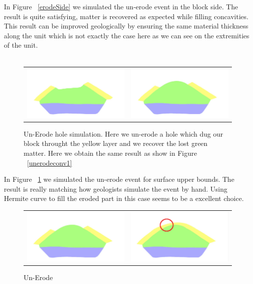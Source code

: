 \documentclass[12pt, a4paper]{report} %
\begin{document}
In Figure ~\ref{erodeSide} we simulated the un-erode event in the block side. The result is quite satisfying, matter is recovered as expected while filling concavities. This result can be improved geologically by ensuring the same material thickness along the unit which is not exactly the case here as we can see on the extremities of the unit.\\\\
\begin{figure}[H]
\centering
\begin{tabular}{@{}cc@{}}
\includegraphics[width=.49\textwidth]{unErodeGap0.png}&
\includegraphics[width=.49\textwidth]{unErodeGap1.png}\\
\end{tabular}
\caption{Un-Erode hole simulation. Here we un-erode a hole which dug our block throught the yellow layer and we recover the lost green matter. Here we obtain the same result as show in Figure ~\ref{unerodeconv1}}
\label{erodeGap}
\end{figure}
In Figure ~\ref{erodeGap} we simulated the un-erode event for surface upper bounds. The result is really matching how geologists simulate the event by hand. Using Hermite curve to fill the eroded part in this case seems to be a excellent choice.
\begin{figure}[H]
\centering
\begin{tabular}{@{}cc@{}}
\includegraphics[width=.49\textwidth]{unErodeUnits0.png}&
\includegraphics[width=.49\textwidth]{unErodeUnits1.png}\\
\end{tabular}
\caption{Un-Erode}
\label{erodeUnits}
\end{figure}
\end{document}
